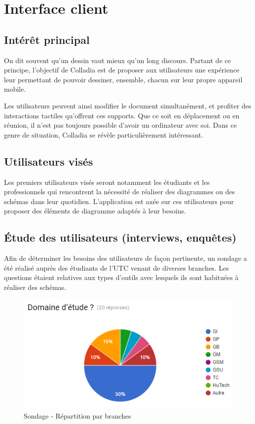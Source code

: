 \newpage
\section{Interface client}
\subsection{Intérêt principal}
On dit souvent qu'un dessin vaut mieux qu'un long discours.
Partant de ce principe, l'objectif de Colladia est de proposer aux utilisateurs une expérience leur permettant de pouvoir dessiner, ensemble, chacun sur leur propre appareil mobile. 

Les utilisateurs peuvent ainsi modifier le document simultanément, et profiter des interactions tactiles qu'offrent ces supports.
Que ce soit en déplacement ou en réunion, il n'est pas toujours possible d'avoir un ordinateur avec soi.
Dans ce genre de situation, Colladia se révèle particulièrement intéressant. 

\subsection{Utilisateurs visés}
Les premiers utilisateurs visés seront notamment les étudiants et les professionnels qui rencontrent la nécessité de réaliser des diagrammes ou des schémas dans leur quotidien.
L'application est axée sur ces utilisateurs pour proposer des éléments de diagramme adaptés à leur besoins.

\subsection{Étude des utilisateurs (interviews, enquêtes)}
Afin de déterminer les besoins des utilisateurs de façon pertinente, un sondage a été réalisé auprès des étudiants de l’UTC venant de diverses branches.
Les questions étaient relatives aux types d'outils avec lesquels ils sont habituées à réaliser des schémas. 

\vspace*{\fill}
\begin{figure}[!h]
	\centering
	\includegraphics[width=.7\textwidth]{img/sondage_branche}
	\caption{Sondage - Répartition par branches}
\end{figure}
\vspace*{\fill}

